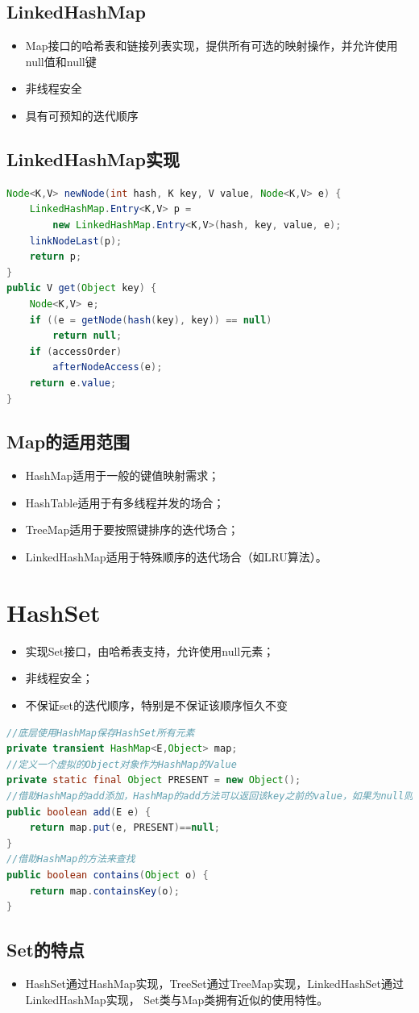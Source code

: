 \subsection{LinkedHashMap}
\begin{itemize}
	\item Map接口的哈希表和链接列表实现，提供所有可选的映射操作，并允许使用null值和null键
	\item 非线程安全
	\item 具有可预知的迭代顺序
\end{itemize}
\subsection{LinkedHashMap实现}
\begin{lstlisting}[language=java]
Node<K,V> newNode(int hash, K key, V value, Node<K,V> e) {
	LinkedHashMap.Entry<K,V> p =
		new LinkedHashMap.Entry<K,V>(hash, key, value, e);
	linkNodeLast(p);
	return p;
}
public V get(Object key) {
	Node<K,V> e;
	if ((e = getNode(hash(key), key)) == null)
		return null;
	if (accessOrder)
		afterNodeAccess(e);
	return e.value;
}
\end{lstlisting}
\subsection{Map的适用范围}
\begin{itemize}
	\item HashMap适用于一般的键值映射需求；
	\item HashTable适用于有多线程并发的场合；
	\item TreeMap适用于要按照键排序的迭代场合；
	\item LinkedHashMap适用于特殊顺序的迭代场合（如LRU算法）。
\end{itemize}

\section{HashSet}
\begin{itemize}
	\item 实现Set接口，由哈希表支持，允许使用null元素；
	\item 非线程安全；
	\item 不保证set的迭代顺序，特别是不保证该顺序恒久不变
\end{itemize}
\begin{lstlisting}[language=java]
//底层使用HashMap保存HashSet所有元素
private transient HashMap<E,Object> map;
//定义一个虚拟的Object对象作为HashMap的Value
private static final Object PRESENT = new Object();
//借助HashMap的add添加，HashMap的add方法可以返回该key之前的value，如果为null则说明之前尚未添加，即HashSet可以添加该元素
public boolean add(E e) {
	return map.put(e, PRESENT)==null;
}
//借助HashMap的方法来查找
public boolean contains(Object o) {
	return map.containsKey(o);
}
\end{lstlisting}
\subsection{Set的特点}
\begin{itemize}
	\item HashSet通过HashMap实现，TreeSet通过TreeMap实现，LinkedHashSet通过LinkedHashMap实现，
	Set类与Map类拥有近似的使用特性。
\end{itemize}